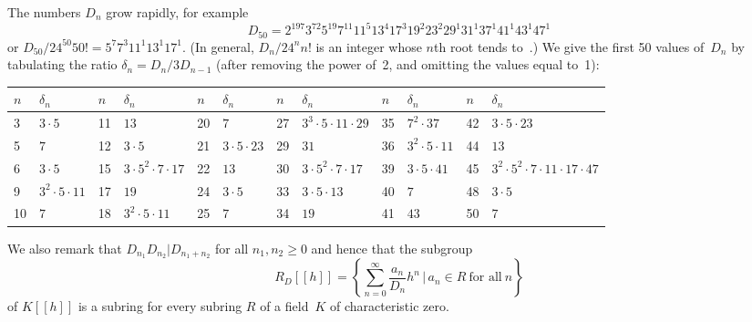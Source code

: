 \documentclass[11pt]{article}
\numberwithin{equation}{section}
\numberwithin{equation}{section}
\def\tcdot{\!\cdot\!}
\begin{document}
The numbers $D_n$ grow rapidly, for example
\[
D_{50} = 2^{197} 3^{72} 5^{19} 7^{11} 11^5 13^4 17^3 19^2 23^2 29^1
 31^1 37^1 41^1 43^1 47^1
\]
or $D_{50}/24^{50}50!=5^7 7^3 11^1 13^1 17^1$. \big(In general, $D_n/24^nn!$ is an
integer whose $n$th root tends to~.\big)
We give the first 50 values of~$D_n$ by tabulating the ratio $\delta_n=D_n/3D_{n-1}$
(after removing the power of~2, and omitting the values equal to~1):

\begin{center}
\small
\begin{tabular}{|ll|ll|ll|ll|ll|ll|}
\hline
$n$ & $\delta_n$ & $n$ & $\delta_n$ & $n$ & $\delta_n$ & $n$ & $\delta_n$ &
$n$ & $\delta_n$ & $n$ & $\delta_n$
\\ \hline
3 & $3 \tcdot 5$ &
11 & $13$ &
20 & $7$ &
27 & $3^3 \tcdot 5 \tcdot 11 \tcdot 29\!$ &
35 & $7^2 \tcdot 37$ &
42 & $3 \tcdot 5 \tcdot 23$
\\ %
5 & $7$ &
12 & $3 \tcdot 5$ &
21 & $3 \tcdot 5 \tcdot 23\!$ &
29 & $31$ &
36 & $3^2 \tcdot 5 \tcdot 11$ &
44 & $13$
\\ %
6 & $3 \tcdot 5$ &
15 & $3 \tcdot 5^2 \tcdot 7 \tcdot 17\!$ &
22 & $13$ &
30 & $3 \tcdot 5^2 \tcdot 7 \tcdot 17$ &
39 & $3 \tcdot 5 \tcdot 41$ &
45 & $3^2 \tcdot 5^2 \tcdot 7 \tcdot 11 \tcdot 17 \tcdot 47\!$
\\ %
9 & $3^2 \tcdot 5 \tcdot 11\!$ &
17 & $19$ &
24 & $3 \tcdot 5$ &
33 & $3 \tcdot 5 \tcdot 13$ &
40 & $7$ &
48 & $3 \tcdot 5$
\\ %
10 & $7$ &
18 & $3^2 \tcdot 5 \tcdot 11$ &
25 & $7$ &
34 & $19$ &
41 & $43$ &
50 & $7$
\\ \hline
\end{tabular}

\end{center}

\noindent
We also remark that $D_{n_1}D_{n_2}|D_{n_1+n_2}$ for all $n_1,n_2\ge0$ and hence
that the subgroup
\[%
R_D[[h]] = \left\{ \sum_{n=0}^\infty \frac{a_n}{D_n} h^n  \,\big|\,
a_n \in R \  \text{for all} \   n \right\}
\]
of $K[[h]]$ is a subring for every subring $R$ of a field~$K$ of characteristic zero.
\end{document}
